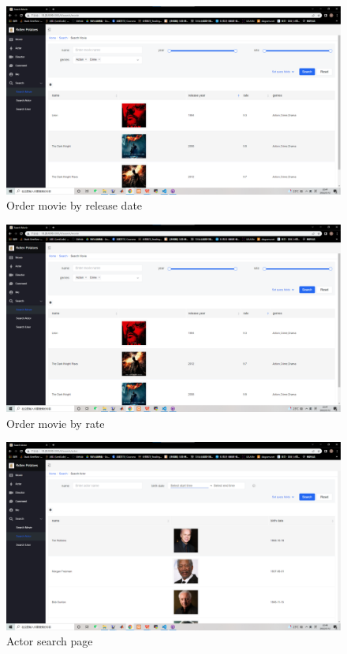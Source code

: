 \begin{CJK*}{UTF8}{gbsn}
    \begin{figure}[htbp]
    \centering
    \includegraphics[width=1\textwidth]{res_search6.png}
    \caption{Order movie by release date}
    \end{figure}
    
    \begin{figure}[htbp]
    \centering
    \includegraphics[width=1\textwidth]{res_search7.png}
    \caption{Order movie by rate}
    \end{figure}
    
    \begin{figure}[htbp]
    \centering
    \includegraphics[width=1\textwidth]{res_search8.png}
    \caption{Actor search page}
    \end{figure}
    

\end{CJK*}
